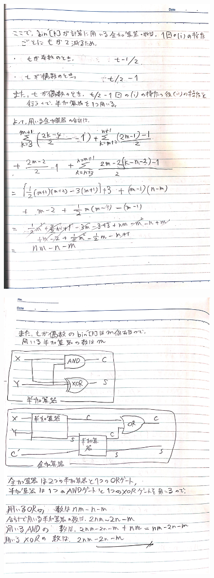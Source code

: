 \documentclass[dvipdfmx,a4paper,12pt]{jsarticle}
\begin{document}
\begin{figure}[htbp]
  \centering
  \includegraphics[width=130mm]{images/IMG_7424.JPG}
\end{figure}
\begin{figure}[htbp]
  \centering
  \includegraphics[width=130mm]{images/IMG_7425.JPG}
\end{figure}




 
\end{document}
